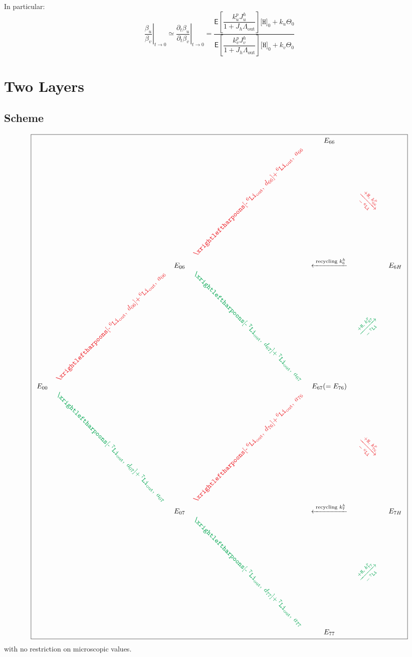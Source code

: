 \documentclass[aps,onecolumn,11pt]{revtex4}
\newcommand{\mychem}[1]{\mathtt{#1}}
\newcommand{\myconc}[1]{\big[#1\big]}
\newcommand{\spLi}[1]{{\!~^{#1}\mychem{Li}}}
\newcommand{\spproton}{\mychem{H}}
\newcommand{\proton}{\myconc{\spproton}}
\newcommand{\myout}[1]{{#1}_{\mathrm{out}}}
\newcommand{\spLiOut}[1]{\myout{\spLi{#1}}}
\newcommand{\myrotate}[2]{\rotatebox[origin=c]{#1}{#2}}
\newcommand{\LiAll}{\Lambda}
\newcommand{\LiAllOut}{\myout{\LiAll}}
\newcommand{\inpLi}[1]{\text{+}\spLiOut{#1}}
\newcommand{\outLi}[1]{\text{-}\spLiOut{#1}}
\newcommand{\mycolor}[2]{\ifthenelse{\equal{#1}{6}}{{\color{Red}#2}}{{\color{Green}#2}}}
\begin{document}
In particular:
\begin{equation}
\label{eq:level1}
	\left.\dfrac{\beta_u}{\beta_v}\right\vert_{t\to0} \simeq \left.\dfrac{\partial_t \beta_u}{\partial_t\beta_v}\right\vert_{t\to0}
	= \dfrac{\mathsf{E} \left[\dfrac{k^p_u J_u^h}{1+J_h \LiAllOut}\right] \proton_0 + k_u  \Theta_0
	}
	{
	\mathsf{E} \left[\dfrac{k^p_v J_v^h}{1+J_h \LiAllOut}\right] \proton_0 + k_v  \Theta_0
	}
\end{equation}


\section{Two Layers}
\subsection{Scheme}
{
\Large
\begin{equation}
\boxed{
\begin{array}{ccccccc}
 & &        &                                                  & E_{66} & & \\
 & &        & \myrotate{45}{\mycolor{6}{$\xrightleftharpoons[\outLi{6},\;d_{66}]{\inpLi{6},\;a_{66}}$}} & &  \myrotate{-45}{\mycolor{6}{$\xrightarrow[-\spLi{6}]{+ \spproton, \; k^p_{66}}$}}& \\
 & & E_{06} &  & \xleftarrow{\text{ recycling } k^h_6 } & & E_{6H}\\
 &  \myrotate{45}{\mycolor{6}{$\xrightleftharpoons[\outLi{6},\;d_{06}]{\inpLi{6},\;a_{06}}$}} &   & \myrotate{-45}{\mycolor{7}{$\xrightleftharpoons[\outLi{7},\;d_{67}]{\inpLi{7},\;a_{67}}$}} & & \myrotate{45}{\mycolor{7}{$\xrightarrow[-\spLi{7}]{+ \spproton, \; k^p_{67}}$}}&\\
E_{00} & &  & & E_{67}(=E_{76}) & & \\ 
  & \myrotate{-45}{\mycolor{7}{$\xrightleftharpoons[\outLi{7},\;d_{07}]{\inpLi{7},\;a_{07}}$}} &  & \myrotate{45}{\mycolor{6}{$\xrightleftharpoons[\outLi{6},\;d_{76}]{\inpLi{6},\;a_{76}}$}} & & \myrotate{-45}{\mycolor{6}{$\xrightarrow[-\spLi{6}]{+ \spproton, \; k^p_{76}}$}} & \\
  & & E_{07} &   & \xleftarrow{\text{ recycling } k^h_7 } & & E_{7H}\\
  & &  & \myrotate{-45}{\mycolor{7}{$\xrightleftharpoons[\outLi{7},\;d_{77}]{\inpLi{7},\;a_{77}}$}} & & \myrotate{45}{\mycolor{7}{$\xrightarrow[-\spLi{7}]{+ \spproton, \; k^p_{77}}$}} &\\
  & &  &  & E_{77} & &\\

 \end{array}
 }
\end{equation}
}
with no restriction on microscopic values.
\end{document}
